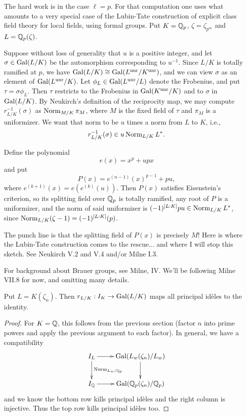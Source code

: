 The hard work is in the case $\ell=p$. For that computation one uses what
amounts to a very special case of the Lubin-Tate construction of
explicit class field theory for local fields, using formal groups.
Put $K = \mathbb{Q}_p$, $\zeta = \zeta_{p^m}$ and $L = \mathbb{Q}_p(\zeta)$.

Suppose without loss of generality that $u$ is a positive integer, and let $\sigma
\in \operatorname{Gal}(L/K)$ be the automorphism corresponding to $u^{-1}$.
Since $L/K$ is totally ramified at $p$, we have
$\operatorname{Gal}(L/K) \cong \operatorname{Gal}(L^{\operatorname{unr}}/K^{\operatorname{unr}})$, and we can view $\sigma$
as an element of $\operatorname{Gal}(L^{\operatorname{unr}}/K)$. Let $\phi_L \in \operatorname{Gal}(L^{\operatorname{unr}}/L)$
denote the Frobenius, and put $\tau = \sigma \phi_L$. Then
$\tau$ restricts to the Frobenius in $\operatorname{Gal}(K^{\operatorname{unr}}/K)$
and to $\sigma$ in $\operatorname{Gal}(L/K)$. By Neukirch's definition of the reciprocity
map, we may compute $r^{-1}_{L/K}(\sigma)$ as
$\operatorname{Norm}_{M/K} \pi_M$, where $M$ is the fixed field of
$\tau$ and $\pi_M$ is a uniformizer. We want that norm to be $u$
times a norm from $L$ to $K$, i.e.,
\[
r^{-1}_{L/K}(\sigma) \in u \operatorname{Norm}_{L/K} L^*.
\]

Define the polynomial
\[
e(x) = x^p + upx
\]
and put
\[
P(x) = e^{(n-1)}(x)^{p-1} + pu,
\]
where $e^{(k+1)}(x) = e(e^{(k)}(u))$. Then $P(x)$ satisfies Eisenstein's
criterion, so its splitting field over $\mathbb{Q}_p$ is totally ramified,
any root of $P$ is a uniformizer, and the norm of said uniformizer is
$(-1)^{[L:K]} pu \in \operatorname{Norm}_{L/K} L^*$, since
$\operatorname{Norm}_{L/K}(\zeta-1) = (-1)^{[L:K]}(p)$.

The punch line is that the splitting field of $P(x)$ is precisely
$M$! Here is where the Lubin-Tate construction comes to the rescue...
and where I will stop this sketch. See Neukirch V.2 and V.4 and/or Milne
I.3.


For background about Brauer groups, see Milne, IV. We'll be following Milne VII.8 for now,
and omitting many details.

\begin{prop}
Put $L = K(\zeta_n)$. Then
$r_{L/K}: I_K \to \operatorname{Gal}(L/K)$ maps all principal id\`eles to the
identity.
\end{prop}
\begin{proof}
For $K = \mathbb{Q}$, this follows from the previous section (factor $n$ into
prime powers and apply the previous argument to each factor).
In general, we have a compatibility
\[
\xymatrix{
I_L \ar[r] \ar^{\Norm_{L_w/\QQ_p}}[d] & \Gal(L_w(\zeta_n)/L_w) \ar[d]\\
I_{\QQ} \ar[r] & \Gal(\QQ_p(\zeta_n)/\QQ_p)
}
\]
and we know the bottom row kills principal id\`eles and the
right column is injective. Thus the top row kills principal id\`eles too.
\end{proof}

